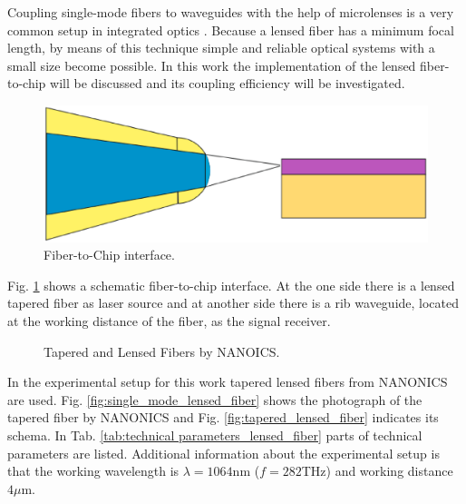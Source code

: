 Coupling single-mode fibers to waveguides with the help of microlenses is a very common setup in integrated optics \cite{integrated_optics}. Because a lensed fiber has a minimum focal length, by means of this technique simple and reliable optical systems with a small size become possible. In this work the implementation of the lensed fiber-to-chip will be discussed and its coupling efficiency will be investigated.\\

\begin{figure}[!ht]
\centering
\includegraphics[width=.7\textwidth]{bilder/experiment_object}
\caption{Fiber-to-Chip interface.}
\label{fig:experiment_object}
\end{figure}
Fig. \ref{fig:experiment_object} shows a schematic fiber-to-chip interface. At the one side there is a lensed tapered fiber as laser source and at another side there is a rib waveguide\cite{integrated_optics}, located at the working distance of the fiber, as the signal receiver.\\
 
\begin{figure}[!ht]
\centering
{}
\hfill
{}
\label{fig:TLFs}
\caption{ Tapered and Lensed Fibers by NANOICS.}
\end{figure}
In the experimental setup for this work tapered lensed fibers from NANONICS\cite{nanoscal_tapered_fiber} are used. Fig. \ref{fig:single_mode_lensed_fiber} shows the photograph of the tapered fiber by NANONICS and Fig. \ref{fig:tapered_lensed_fiber} indicates its schema. In Tab. \ref{tab:technical parameters_lensed_fiber} parts of technical parameters are listed. Additional information about the experimental setup is that the working wavelength is $\lambda=1064$nm ($f=282$THz) and working distance $4\mu$m.\\
 
